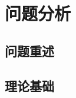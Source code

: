 \chapter[\hspace{0pt}问题分析]{{\heiti{}\hspace{0pt}问题分析}}

\removelofgap
\removelotgap

\section[\hspace{-2pt}问题重述]{{\heiti{} \hspace{-8pt}问题重述}}\label{section2: 问题重述}

\section[\hspace{-2pt}理论基础]{{\heiti{} \hspace{-8pt}理论基础}}\label{section2: 理论基础}